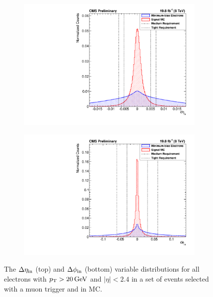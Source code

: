 \begin{figure}[!htbp]
    \centering
    \begin{subfigure}[b]{\StackedPlotWidth}
        \includegraphics[width=\textwidth]{figures/e_reco_var_deta.pdf}
        \caption{}
        \label{fig:deta}
    \end{subfigure}
    \begin{subfigure}[b]{\StackedPlotWidth}
        \includegraphics[width=\textwidth]{figures/e_reco_var_dphi.pdf}
        \caption{}
        \label{fig:dphi}
    \end{subfigure}
    \caption[
        Distributions of $\detain$ and $\dphiin$ in data and MC.
    ]{
        The $\detain$ (top) and $\dphiin$ (bottom) variable distributions for
        all electrons with $p_{\mathrm{T}} > 20 \,\text{Ge\hspace{-.08em}V}$ and $|\eta| < 2.4$ in a set of
        events selected with a muon trigger and in \MADGRAPH \Ztoee MC.
    }
    \label{fig:dtrack}
\end{figure}

